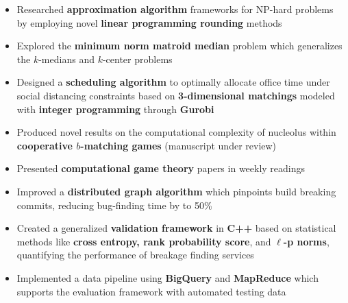 \documentclass[10pt,a4paper,ragged2e]{altacv}
\begin{document}
\begin{paracol}{2}
\makecvheader

\begin{itemize}
    \item Researched \textbf{approximation algorithm} frameworks for NP-hard problems
      by employing novel \textbf{linear programming rounding} methods
    \item Explored the \textbf{minimum norm matroid median} problem
      which generalizes the $k$-medians and $k$-center problems
\end{itemize}

\divider

\begin{itemize}
    \item Designed a \textbf{scheduling algorithm} to optimally allocate office time under social distancing constraints
      based on \textbf{3-dimensional matchings} modeled with \textbf{integer programming} through \textbf{Gurobi}
    \item Produced novel results on the computational complexity of nucleolus
      within \textbf{cooperative $b$-matching games}
      (manuscript under review)
    \item Presented \textbf{computational game theory} papers in weekly readings
\end{itemize}

\divider

\begin{itemize}
    \item Improved a \textbf{distributed graph algorithm} which pinpoints build breaking commits,
      reducing bug-finding time by to 50\%
    \item Created a generalized \textbf{validation framework} in \textbf{C++}
      based on statistical methods like \textbf{cross entropy, rank probability score}, and \textbf{$\ell$-p norms},
      quantifying the performance of breakage finding services
    \item Implemented a data pipeline using \textbf{BigQuery} and \textbf{MapReduce}
      which supports the evaluation framework with automated testing data
\end{itemize}


\end{paracol}
\end{document}

